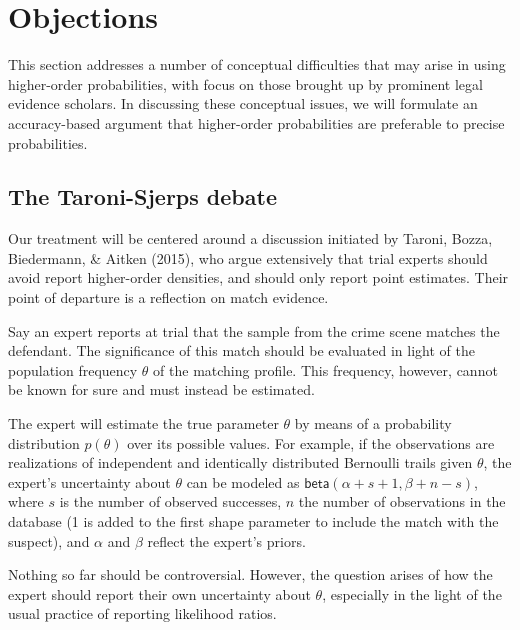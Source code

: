 \documentclass[
  10pt,
  dvipsnames,enabledeprecatedfontcommands]{scrartcl}
\newcommand{\s}[1]{\mbox{$\mathsf{#1}$}}
\begin{document}
\hypertarget{objections}{%
\section{Objections}\label{objections}}

\label{sec:objections}

This section addresses a number of conceptual difficulties that may
arise in using higher-order probabilities, with focus on those brought
up by prominent legal evidence scholars. In discussing these conceptual
issues, we will formulate an accuracy-based argument that higher-order
probabilities are preferable to precise probabilities.

\hypertarget{the-taroni-sjerps-debate}{%
\subsection{The Taroni-Sjerps debate}\label{the-taroni-sjerps-debate}}

Our treatment will be centered around a discussion initiated by Taroni,
Bozza, Biedermann, \& Aitken (2015), who argue extensively that trial
experts should avoid report higher-order densities, and should only
report point estimates. Their point of departure is a reflection on
match evidence.

Say an expert reports at trial that the sample from the crime scene
matches the defendant. The significance of this match should be
evaluated in light of the population frequency \(\theta\) of the
matching profile. This frequency, however, cannot be known for sure and
must instead be estimated.

The expert will estimate the true parameter \(\theta\) by means of a
probability distribution \(p(\theta)\) over its possible values. For
example, if the observations are realizations of independent and
identically distributed Bernoulli trails given \(\theta\), the expert's
uncertainty about \(\theta\) can be modeled as
\(\s{beta}(\alpha + s + 1 ,\beta + n - s)\), where \(s\) is the number
of observed successes, \(n\) the number of observations in the database
(1 is added to the first shape parameter to include the match with the
suspect), and \(\alpha\) and \(\beta\) reflect the expert's priors.

Nothing so far should be controversial. However, the question arises of
how the expert should report their own uncertainty about \(\theta\),
especially in the light of the usual practice of reporting likelihood
ratios.
\end{document}
